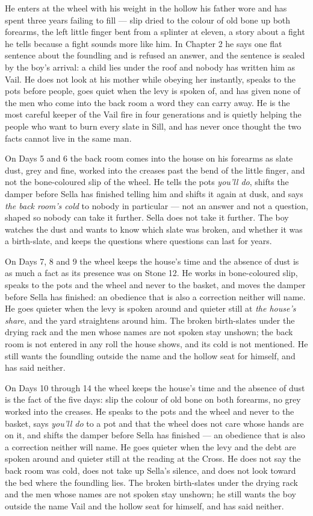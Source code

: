 \documentclass{design/chronicle}
\begin{document}
{
He enters at the wheel with his weight in the hollow his father wore and has spent three years failing to fill --- slip dried to the colour of old bone up both forearms, the left little finger bent from a splinter at eleven, a story about a fight he tells because a fight sounds more like him. In Chapter 2 he says one flat sentence about the foundling and is refused an answer, and the sentence is sealed by the boy’s arrival: a child lies under the roof and nobody has written him as Vail. He does not look at his mother while obeying her instantly, speaks to the pots before people, goes quiet when the levy is spoken of, and has given none of the men who come into the back room a word they can carry away. He is the most careful keeper of the Vail fire in four generations and is quietly helping the people who want to burn every slate in Sill, and has never once thought the two facts cannot live in the same man.

On Days 5 and 6 the back room comes into the house on his forearms as slate dust, grey and fine, worked into the creases past the bend of the little finger, and not the bone-coloured slip of the wheel. He tells the pots \emph{you’ll do}, shifts the damper before Sella has finished telling him and shifts it again at dusk, and says \emph{the back room’s cold} to nobody in particular --- not an answer and not a question, shaped so nobody can take it further. Sella does not take it further. The boy watches the dust and wants to know which slate was broken, and whether it was a birth-slate, and keeps the questions where questions can last for years.

On Days 7, 8 and 9 the wheel keeps the house’s time and the absence of dust is as much a fact as its presence was on Stone 12. He works in bone-coloured slip, speaks to the pots and the wheel and never to the basket, and moves the damper before Sella has finished: an obedience that is also a correction neither will name. He goes quieter when the levy is spoken around and quieter still at \emph{the house’s share}, and the yard straightens around him. The broken birth-slates under the drying rack and the men whose names are not spoken stay unshown; the back room is not entered in any roll the house shows, and its cold is not mentioned. He still wants the foundling outside the name and the hollow seat for himself, and has said neither.

On Days 10 through 14 the wheel keeps the house’s time and the absence of dust is the fact of the five days: slip the colour of old bone on both forearms, no grey worked into the creases. He speaks to the pots and the wheel and never to the basket, says \emph{you’ll do} to a pot and that the wheel does not care whose hands are on it, and shifts the damper before Sella has finished --- an obedience that is also a correction neither will name. He goes quieter when the levy and the debt are spoken around and quieter still at the reading at the Cross. He does not say the back room was cold, does not take up Sella’s silence, and does not look toward the bed where the foundling lies. The broken birth-slates under the drying rack and the men whose names are not spoken stay unshown; he still wants the boy outside the name Vail and the hollow seat for himself, and has said neither.

}
\end{document}
